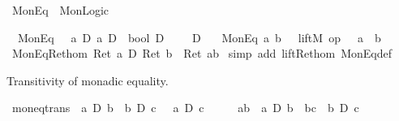%
\begin{isabellebody}%
\def\isabellecontext{MonEq}%
%
\isamarkuptrue%
\ MonEq\ {\isacharequal}\ MonLogic{\isacharcolon}\isamarkupfalse%
%
\begin{isamarkuptext}%
\label{sec:moneq-thy}%
\end{isamarkuptext}%
\isamarkuptrue%
\isanewline
\ \ {\isachardoublequote}MonEq{\isachardoublequote}\ \ {\isacharcolon}{\isacharcolon}\ {\isachardoublequote}{\isacharbrackleft}{\isacharprime}a\ D{\isacharcomma}\ {\isacharprime}a\ D{\isacharbrackright}\ {\isasymRightarrow}\ bool\ D{\isachardoublequote}\ \ \ \ {\isacharparenleft}\ {\isachardoublequote}{\isacharequal}\isactrlsub D{\isachardoublequote}\ {}{}{\isacharparenright}\isanewline
\ \ {\isachardoublequote}MonEq\ a\ b\ {\isasymequiv}\ {\isasymUp}\ {\isacharparenleft}liftM{}\ {\isacharparenleft}op\ {\isacharequal}{\isacharparenright}\ {\isacharparenleft}{\isasymDown}\ a{\isacharparenright}\ {\isacharparenleft}{\isasymDown}\ b{\isacharparenright}{\isacharparenright}{\isachardoublequote}\isanewline
\isanewline
\isanewline
\isamarkupfalse%
\ MonEq{\isacharunderscore}Ret{\isacharunderscore}hom{\isacharcolon}\ {\isachardoublequote}{\isacharparenleft}{\isacharparenleft}Ret\ a{\isacharparenright}\ {\isacharequal}\isactrlsub D\ {\isacharparenleft}Ret\ b{\isacharparenright}{\isacharparenright}\ {\isacharequal}\ {\isacharparenleft}Ret\ {\isacharparenleft}a{\isacharequal}b{\isacharparenright}{\isacharparenright}{\isachardoublequote}\isanewline
\isamarkupfalse%
\ {\isacharparenleft}simp\ add{\isacharcolon}\ lift{\isacharunderscore}Ret{\isacharunderscore}hom\ MonEq{\isacharunderscore}def{\isacharparenright}\isamarkupfalse%
%
\begin{isamarkuptext}%
Transitivity of monadic equality.%
\end{isamarkuptext}%
\isamarkuptrue%
\ mon{\isacharunderscore}eq{\isacharunderscore}trans{\isacharcolon}\ {\isachardoublequote}{\isasymlbrakk}{\isasymturnstile}\ a\ {\isacharequal}\isactrlsub D\ b{\isacharsemicolon}\ {\isasymturnstile}\ b\ {\isacharequal}\isactrlsub D\ c{\isasymrbrakk}\ {\isasymLongrightarrow}\ {\isasymturnstile}\ a\ {\isacharequal}\isactrlsub D\ c{\isachardoublequote}\isanewline
\isamarkupfalse%
\ {\isacharminus}\isanewline
\ \ \isamarkupfalse%
\ ab{\isacharcolon}\ {\isachardoublequote}{\isasymturnstile}\ a\ {\isacharequal}\isactrlsub D\ b{\isachardoublequote}\ \ bc{\isacharcolon}\ {\isachardoublequote}{\isasymturnstile}\ b\ {\isacharequal}\isactrlsub D\ c{\isachardoublequote}\isanewline

\end{isabellebody}
